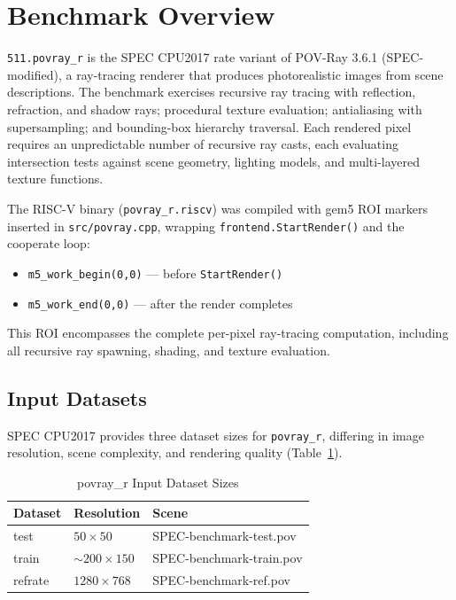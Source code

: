 \documentclass[conference]{IEEEtran}
\begin{document}
\section{Benchmark Overview}

\texttt{511.povray\_r} is the SPEC CPU2017 rate variant of POV-Ray
3.6.1 (SPEC-modified), a ray-tracing renderer that produces
photorealistic images from scene descriptions. The benchmark exercises
recursive ray tracing with reflection, refraction, and shadow rays;
procedural texture evaluation; antialiasing with supersampling;
and bounding-box hierarchy traversal. Each rendered pixel requires
an unpredictable number of recursive ray casts, each evaluating
intersection tests against scene geometry, lighting models, and
multi-layered texture functions.

The RISC-V binary (\texttt{povray\_r.riscv}) was compiled with gem5
ROI markers inserted in \texttt{src/povray.cpp}, wrapping
\texttt{frontend.StartRender()} and the cooperate loop:

\begin{itemize}
    \item \texttt{m5\_work\_begin(0,0)} --- before \texttt{StartRender()}
    \item \texttt{m5\_work\_end(0,0)}   --- after the render completes
\end{itemize}

This ROI encompasses the complete per-pixel ray-tracing computation,
including all recursive ray spawning, shading, and texture evaluation.

\subsection{Input Datasets}

SPEC CPU2017 provides three dataset sizes for \texttt{povray\_r},
differing in image resolution, scene complexity, and rendering quality
(Table~\ref{tab:inputs}).

\begin{table}[H]
\centering
\caption{povray\_r Input Dataset Sizes}
\label{tab:inputs}
\begin{tabular}{lll}
\toprule
\textbf{Dataset} & \textbf{Resolution} & \textbf{Scene} \\
\midrule
test    & $50\times50$           & SPEC-benchmark-test.pov \\
train   & $\sim$$200\times150$   & SPEC-benchmark-train.pov \\
refrate & $1280\times768$        & SPEC-benchmark-ref.pov \\
\bottomrule
\end{tabular}
\end{table}
\end{document}
